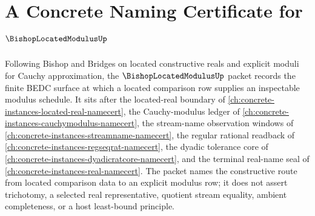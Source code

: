 \chapter{A Concrete Naming Certificate for $\BishopLocatedModulusUp$}
\label{ch:concrete-instances-bishop-located-modulus-namecert}

Following Bishop and Bridges on located constructive reals and explicit moduli for Cauchy approximation, the $\BishopLocatedModulusUp$ packet records the finite BEDC surface at which a located comparison row supplies an inspectable modulus schedule. It sits after the located-real boundary of \autoref{ch:concrete-instances-located-real-namecert}, the Cauchy-modulus ledger of \autoref{ch:concrete-instances-cauchymodulus-namecert}, the stream-name observation windows of \autoref{ch:concrete-instances-streamname-namecert}, the regular rational readback of \autoref{ch:concrete-instances-regseqrat-namecert}, the dyadic tolerance core of \autoref{ch:concrete-instances-dyadicratcore-namecert}, and the terminal real-name seal of \autoref{ch:concrete-instances-real-namecert}. The packet names the constructive route from located comparison data to an explicit modulus row; it does not assert trichotomy, a selected real representative, quotient stream equality, ambient completeness, or a host least-bound principle.


